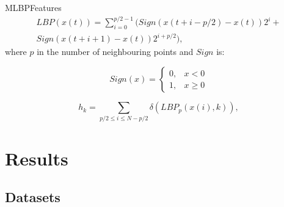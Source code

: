 \documentclass[10pt]{beamer}
\newcommand{\1}{
	\setbeamertemplate{background}{
		\texttt{[image: img/1\_dna]}
		\tikz[overlay] \fill[fill opacity=0.75,fill=white] (0,0) rectangle (-\paperwidth,\paperheight);
	}
}
\begin{document}
\begin{frame}{MLBP}{Features}
	\begin{equation} \label{eq:mlbp}
	\begin{split}
	LBP(x(t)) =  \sum_{i=0}^{p/2 - 1} ( Sign ( x(t+i - p/2) - x(t) )2^i +  \\
	Sign( x(t+i+1) - x(t) )2^{i+p/2}  ),
	\end{split}
	\end{equation}		
	where $p$ in the number of neighbouring points and $Sign$ is:
	
	\begin{equation} \label{eq:sign}
	Sign(x) =   
	\begin{cases}
	0, & x < 0 \\
	1, & x \geq 0
	\end{cases}
	\end{equation}
	
	\begin{equation} \label{eq:kro}
	h_k = \sum_{ p/2 \leq i \leq N - p/2} \delta (LBP_p( x(i), k ) ),
	\end{equation}
\end{frame}




\section{Results}

\subsection{Datasets}
\end{document}
